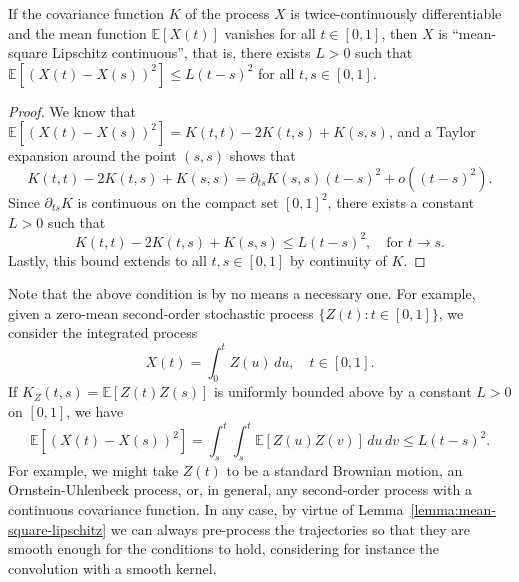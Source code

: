 \begin{lemma}\label{lemma:mean-square-lipschitz}
  If the covariance function \(K\) of the process \(X\) is twice-continuously differentiable and the mean function \(\mathbb E[X(t)]\) vanishes for all \(t\in[0,1]\), then \(X\) is ``mean-square Lipschitz continuous'', that is, there exists \(L>0\) such that \(\mathbb E[(X(t) - X(s))^2] \leq L (t-s)^2\) for all \(t, s \in [0,1]\).
\end{lemma}
\begin{proof}
We know that \(\mathbb E[(X(t) - X(s))^2] = K(t,t)-2K(t,s) + K(s,s)\), and a Taylor expansion around the point \((s,s)\) shows that
\[
  K(t,t)-2K(t,s) + K(s,s) = \partial_{ts}K(s,s)(t-s)^2 + o((t-s)^2).
  \]
Since \(\partial_{ts}K\) is continuous on the compact set \([0,1]^2\), there exists a constant \(L>0\) such that
\[
  K(t,t)-2K(t,s) + K(s,s) \leq L(t-s)^2, \quad \text{for } t\to s.
\]
Lastly, this bound extends to all \(t,s\in[0,1]\) by continuity of \(K\).
\end{proof}

Note that the above condition is by no means a necessary one. For example, given a zero-mean second-order stochastic process \(\{Z(t): t \in [0,1]\}\), we consider the integrated process
\[
  X(t)=\int_0^t Z(u)\, du, \quad t\in [0,1].
\]
If \(K_Z(t,s)=\mathbb E[Z(t)Z(s)]\) is uniformly bounded above by a constant \(L>0\) on \([0,1]\), we have
\[
  \mathbb E\left[(X(t) - X(s))^2\right] = \int_s^t \int_s^t \mathbb E[Z(u)Z(v)]\, du\,dv \leq L(t-s)^2.
\]
For example, we might take \(Z(t)\) to be a standard Brownian motion, an Ornstein-Uhlenbeck process, or, in general, any second-order process with a continuous covariance function. In any case, by virtue of Lemma~\ref{lemma:mean-square-lipschitz} we can always pre-process the trajectories so that they are smooth enough for the conditions to hold, considering for instance the convolution with a smooth kernel.



